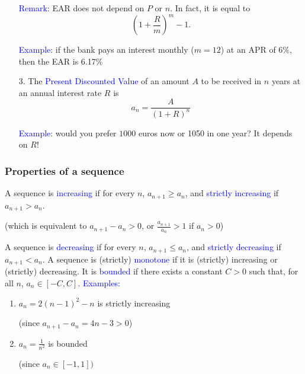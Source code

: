 \documentclass[11pt,aspectratio=169]{beamer}
\begin{document}
\begin{frame}{}
\begin{enumerate}
\item[] \textcolor{blue}{Remark}:  EAR does not depend on $P$ or $n$. In fact, it is equal to
$$
\left( 1+\frac{R}{m}\right)^m-1.
$$

\textcolor{blue}{Example}: if the bank pays an interest monthly ($m=12$) at an APR of $6\%$, then the EAR is 6.17$\%$

\vskip 12pt

\item[3.] The \textcolor{blue}{Present Discounted Value} of an amount $A$ to be received in $n$ years at an annual interest rate $R$ is
$$
a_n=\frac{A}{(1+R)^n}
$$

\textcolor{blue}{Example}: would you prefer $1000$ euros now or 1050 in one year? It depends on $R$! \end{enumerate}
\end{frame}


\begin{frame}
\frametitle{Properties of a sequence}
 A sequence is  \textcolor{blue}{increasing} if for every $n$, $a_{n+1} \geq a_n$, and \textcolor{blue}{strictly increasing} if $a_{n+1}  >a_n$. \begin{tiny} (which is equivalent to $a_{n+1}-a_n>0$, or $\frac{a_{n+1}}{{a_n}}>1$ if $a_n>0$) \end{tiny}
\vskip 12pt
A sequence is \textcolor{blue}{decreasing} if for every $n$, $a_{n+1} \leq a_n$, and \textcolor{blue}{strictly decreasing} if $a_{n+1}  <a_n$.
\vskip 12pt
A sequence is (strictly) \textcolor{blue}{monotone} if it is (strictly) increasing or (strictly) decreasing.
\vskip 12pt
It is \textcolor{blue}{bounded} if there exists a constant $C>0$ such that,
for all  $n$, $a_{n} \in [-C, C]$.
\vskip 12pt
\textcolor{blue}{Examples:} 
\begin{enumerate}
\item $a_n=2(n-1)^2-n$ is strictly increasing \begin{tiny} (since $a_{n+1}-a_n=4n-3>0$)\end{tiny}

\item $a_n=\frac{1}{n^2}$ is bounded\begin{tiny} (since $a_n \in [-1,1])$\end{tiny}
\end{enumerate}
\end{frame}
\end{document}
